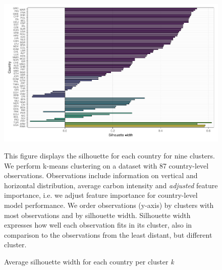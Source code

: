 \documentclass[12pt, a4paper]{article}
\newenvironment{subcaption}
{\strut
\vspace{-5pt}
\begin{minipage}[b]{0.9\textwidth}
  \hspace*{-\parindent}
  \footnotesize}
 {\end{minipage}}
\begin{document}
 \clearpage

 \begin{figure}[ht!]
   \centering
   \caption{Average silhouette width for each country per cluster \textit{k}} \label{fig:G4_silhouette_2}
   \includegraphics{Figures_Appendix/Figure_Silhouette_Clusters_2}
   \begin{subcaption}
     This figure displays the silhouette for each country for nine clusters. We perform k-means clustering on a dataset with 87 country-level observations. Observations include information on vertical and horizontal distribution, average carbon intensity and \textit{adjusted} feature importance, i.e. we adjust feature importance for country-level model performance. We order observations (y-axis) by clusters with most observations and by silhouette width. Silhouette width expresses how well each observation fits in its cluster, also in comparison to the observations from the least distant, but different cluster.
   \end{subcaption}
 \end{figure}

 \clearpage
\end{document}
